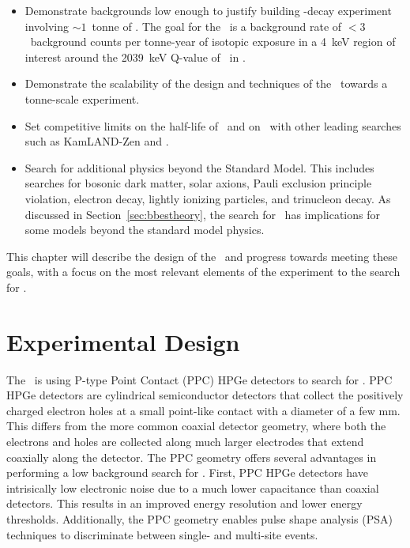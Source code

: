 \documentclass[/main.tex]{subfiles}
\begin{document}
\begin{itemize}
\item Demonstrate backgrounds low enough to justify building \bb -decay experiment involving $\sim1$~tonne of . The goal for the \MJD\ is a background rate of $<3$~background counts per tonne-year of isotopic exposure in a 4~keV region of interest around the 2039~keV Q-value of \znbb\ in .
\item Demonstrate the scalability of the design and techniques of the \MJD\ towards a tonne-scale experiment.
\item Set competitive limits on the half-life of \znbb\ and on \mbb\ with other leading searches such as KamLAND-Zen and \Gerda \cite{kamlandzen, gerda}.
\item Search for additional physics beyond the Standard Model. This includes searches for bosonic dark matter, solar axions, Pauli exclusion principle violation, electron decay, lightly ionizing particles, and trinucleon decay\cite{mjdlowE2017, mjdlips2019, mjdtrinuc2019}. As discussed in Section~\ref{sec:bbestheory}, the search for \bbes\ has implications for some models beyond the standard model physics.
\end{itemize}
This chapter will describe the design of the \MJD\ and progress towards meeting these goals, with a focus on the most relevant elements of the experiment to the search for \bbes.

\section{Experimental Design}
The \MJD\ is using P-type Point Contact (PPC)\cite{Luke1989, Barbeau2007} HPGe detectors to search for \znbb.
PPC HPGe detectors are cylindrical semiconductor detectors that collect the positively charged electron holes at a small point-like contact with a diameter of a few mm.
This differs from the more common coaxial detector geometry, where both the electrons and holes are collected along much larger electrodes that extend coaxially along the detector.
The PPC geometry offers several advantages in performing a low background search for \znbb.
First, PPC HPGe detectors have intrisically low electronic noise due to a much lower capacitance than coaxial detectors.
This results in an improved energy resolution and lower energy thresholds.
Additionally, the PPC geometry enables pulse shape analysis (PSA) techniques to discriminate between single- and multi-site events.
\end{document}
